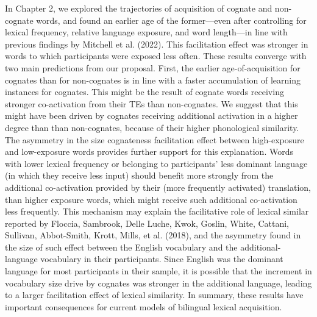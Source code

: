 \documentclass[
  12pt,
  b5paperpaper,
  twoside]{scrreprt}
\begin{document}
In Chapter 2, we explored the trajectories of acquisition of cognate and
non-cognate words, and found an earlier age of the former---even after
controlling for lexical frequency, relative language exposure, and word
length---in line with previous findings by Mitchell et al. (2022). This
facilitation effect was stronger in words to which participants were
exposed less often. These results converge with two main predictions
from our proposal. First, the earlier age-of-acquisition for cognates
than for non-cognates is in line with a faster accumulation of learning
instances for cognates. This might be the result of cognate words
receiving stronger co-activation from their TEs than non-cognates. We
suggest that this might have been driven by cognates receiving
additional activation in a higher degree than than non-cognates, because
of their higher phonological similarity. The asymmetry in the size
cognateness facilitation effect between high-exposure and low-exposure
words provides further support for this explanation. Words with lower
lexical frequency or belonging to participants' less dominant language
(in which they receive less input) should benefit more strongly from the
additional co-activation provided by their (more frequently activated)
translation, than higher exposure words, which might receive such
additional co-activation less frequently. This mechanism may explain the
facilitative role of lexical similar reported by Floccia, Sambrook,
Delle Luche, Kwok, Goslin, White, Cattani, Sullivan, Abbot-Smith, Krott,
Mills, et al. (2018), and the asymmetry found in the size of such effect
between the English vocabulary and the additional-language vocabulary in
their participants. Since English was the dominant language for most
participants in their sample, it is possible that the increment in
vocabulary size drive by cognates was stronger in the additional
language, leading to a larger facilitation effect of lexical similarity.
In summary, these results have important consequences for current models
of bilingual lexical acquisition.
\end{document}
